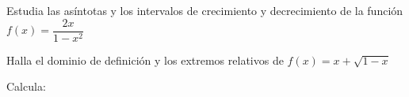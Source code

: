 \documentclass[addpoints,spanish, 12pt,a4paper]{exam}
\begin{document}
\begin{questions}
\question[4] Estudia las asíntotas y los intervalos de crecimiento y decrecimiento de la función $f(x)=\dfrac{2x}{1-x^2}$

\question[3] Halla el dominio de definición y los extremos relativos de $f(x)=x+\sqrt{1-x}$



\question Calcula:


\addpoints


\end{questions}
\end{document}
